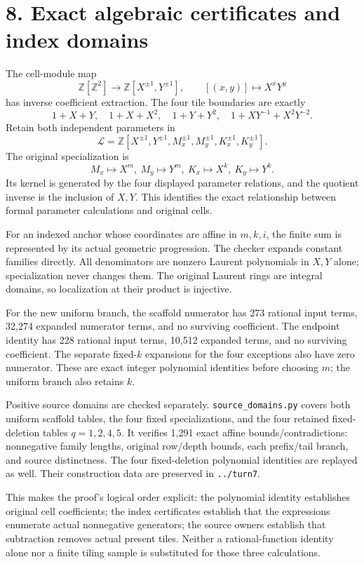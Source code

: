 \documentclass[
  11pt,
]{article}
\begin{document}
\section{8. Exact algebraic certificates and index
domains}\label{exact-algebraic-certificates-and-index-domains}

The cell-module map \[
 \mathbb Z[\mathbb Z^2]\longrightarrow
 \mathbb Z[X^{\pm1},Y^{\pm1}],\qquad[(x,y)]\mapsto X^xY^y
\] has inverse coefficient extraction. The four tile boundaries are
exactly \[
 1+X+Y,\quad1+X+X^2,\quad1+Y+Y^2,
 \quad1+XY^{-1}+X^2Y^{-2}.
\] Retain both independent parameters in \[
 \mathcal L=\mathbb Z[X^{\pm1},Y^{\pm1},
 M_x^{\pm1},M_y^{\pm1},K_x^{\pm1},K_y^{\pm1}].
\] The original specialization is \[
 M_x\mapsto X^m,\ M_y\mapsto Y^m,\
 K_x\mapsto X^k,\ K_y\mapsto Y^k.
\] Its kernel is generated by the four displayed parameter relations,
and the quotient inverse is the inclusion of \(X,Y\). This identifies
the exact relationship between formal parameter calculations and
original cells.

For an indexed anchor whose coordinates are affine in \(m,k,i\), the
finite sum is represented by its actual geometric progression. The
checker expands constant families directly. All denominators are nonzero
Laurent polynomials in \(X,Y\) alone; specialization never changes them.
The original Laurent rings are integral domains, so localization at
their product is injective.

For the new uniform branch, the scaffold numerator has 273 rational
input terms, 32,274 expanded numerator terms, and no surviving
coefficient. The endpoint identity has 228 rational input terms, 10,512
expanded terms, and no surviving coefficient. The separate fixed-\(k\)
expansions for the four exceptions also have zero numerator. These are
exact integer polynomial identities before choosing \(m\); the uniform
branch also retains \(k\).

Positive source domains are checked separately.
\texttt{source\_domains.py} covers both uniform scaffold tables, the
four fixed specializations, and the four retained fixed-deletion tables
\(q=1,2,4,5\). It verifies 1,291 exact affine bounds/contradictions:
nonnegative family lengths, original row/depth bounds, each prefix/tail
branch, and source distinctness. The four fixed-deletion polynomial
identities are replayed as well. Their construction data are preserved
in \texttt{../turn7}.

This makes the proof's logical order explicit: the polynomial identity
establishes original cell coefficients; the index certificates establish
that the expressions enumerate actual nonnegative generators; the source
owners establish that subtraction removes actual present tiles. Neither
a rational-function identity alone nor a finite tiling sample is
substituted for those three calculations.
\end{document}
